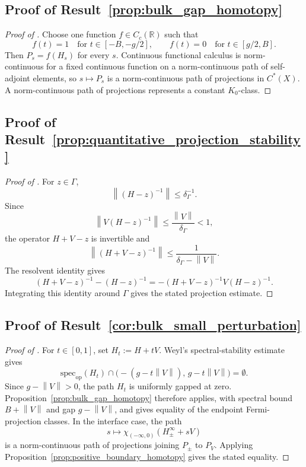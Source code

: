 \documentclass[11pt]{article}
\numberwithin{equation}{section}
\theoremstyle{definition}
\theoremstyle{remark}
\newcommand{\spec}{\mathrm{spec}}
\newcommand{\opnorm}[1]{\left\lVert#1\right\rVert}
\begin{document}
\subsection{Proof of Result~\ref{prop:bulk_gap_homotopy}}\label{app:proof:prop:bulk_gap_homotopy}
\begin{proof}[Proof of ]
Choose one function $f\in C_c(\mathbb R)$ such that
\[
f(t)=1\quad\text{for }t\in[-B,-g/2],
\qquad
f(t)=0\quad\text{for }t\in[g/2,B].
\]
Then $P_s=f(H_s)$ for every $s$. Continuous functional calculus is norm-continuous for a fixed
continuous function on a norm-continuous path of self-adjoint elements, so $s\mapsto P_s$ is a
norm-continuous path of projections in $C^*(X)$. A norm-continuous path of projections represents a
constant $K_0$-class.
\end{proof}

\subsection{Proof of Result~\ref{prop:quantitative_projection_stability}}\label{app:proof:prop:quantitative_projection_stability}
\begin{proof}[Proof of ]
For $z\in\Gamma$,
\[
\opnorm{(H-z)^{-1}}\le \delta_\Gamma^{-1}.
\]
Since
\[
\opnorm{V(H-z)^{-1}}\le \frac{\opnorm V}{\delta_\Gamma}<1,
\]
the operator $H+V-z$ is invertible and
\[
\opnorm{(H+V-z)^{-1}}\le \frac1{\delta_\Gamma-\opnorm V}.
\]
The resolvent identity gives
\[
(H+V-z)^{-1}-(H-z)^{-1}=-(H+V-z)^{-1}V(H-z)^{-1}.
\]
Integrating this identity around $\Gamma$ gives the stated projection estimate.
\end{proof}

\subsection{Proof of Result~\ref{cor:bulk_small_perturbation}}\label{app:proof:cor:bulk_small_perturbation}\label{app:proof:cor:positive_interface_small_perturbation}
\begin{proof}[Proof of ]
For $t\in[0,1]$, set $H_t:=H+tV$. Weyl's spectral-stability estimate gives
\[
\spec_{\mathrm{op}}(H_t)\cap\bigl(-(g-t\opnorm V),\,g-t\opnorm V\bigr)=\emptyset.
\]
Since $g-\opnorm V>0$, the path $H_t$ is uniformly gapped at zero. Proposition~\ref{prop:bulk_gap_homotopy}
therefore applies, with spectral bound $B+\opnorm V$ and gap $g-\opnorm V$, and gives equality of
the endpoint Fermi-projection classes. In the interface case, the path
\[
s\longmapsto \chi_{(-\infty,0)}(H_\pm^\infty+sV)
\]
is a norm-continuous path of projections joining $P_\pm$ to $P_V$. Applying
Proposition~\ref{prop:positive_boundary_homotopy} gives the stated equality.
\end{proof}
\end{document}
